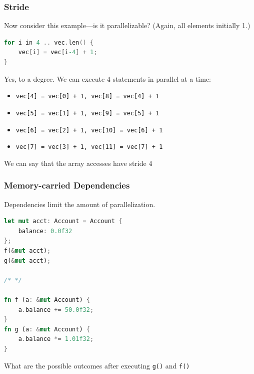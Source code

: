 \begin{frame}[fragile]
\frametitle{Stride}

 Now consider this example---is it parallelizable? (Again, all elements initially 1.)

\begin{lstlisting}[language=C]
for i in 4 .. vec.len() {
    vec[i] = vec[i-4] + 1;
}
\end{lstlisting}

\pause

Yes, to a degree. We can execute 4 statements in parallel at a time:
\begin{itemize}
  \item \texttt{vec[4] = vec[0] + 1, vec[8] = vec[4] + 1}
  \item \texttt{vec[5] = vec[1] + 1, vec[9] = vec[5] + 1}
  \item \texttt{vec[6] = vec[2] + 1, vec[10] = vec[6] + 1}
  \item \texttt{vec[7] = vec[3] + 1, vec[11] = vec[7] + 1}
\end{itemize}  
We can say that the array accesses have stride 4

\end{frame}



\begin{frame}[fragile]
\frametitle{Memory-carried Dependencies}

Dependencies limit the amount of parallelization.

\begin{lstlisting}[language=Rust]
let mut acct: Account = Account {
    balance: 0.0f32
};
f(&mut acct);
g(&mut acct);

/* */

fn f (a: &mut Account) {
    a.balance += 50.0f32;
}
fn g (a: &mut Account) {
    a.balance *= 1.01f32;
}
\end{lstlisting}

What are the possible outcomes after executing {\tt g()} and {\tt f()}


\end{frame}







